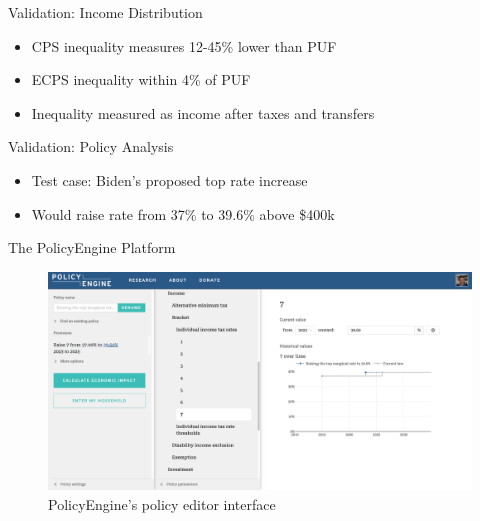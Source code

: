 \documentclass{beamer}
\begin{document}
\begin{frame}{Validation: Income Distribution}
    \begin{table}
        \centering
        
    \end{table}
    \begin{itemize}
        \item CPS inequality measures 12-45\% lower than PUF
        \item ECPS inequality within 4\% of PUF
        \item Inequality measured as income after taxes and transfers
    \end{itemize}
\end{frame}

\begin{frame}{Validation: Policy Analysis}
    \begin{itemize}
        \item Test case: Biden's proposed top rate increase
        \item Would raise rate from 37\% to 39.6\% above \$400k
    \end{itemize}
    \begin{table}
        \centering
        
    \end{table}
\end{frame}

\begin{frame}{The PolicyEngine Platform}
    \begin{figure}
        \centering
        \includegraphics[width=\textwidth]{../../paper/figures/policyengine_policy.png}
        \caption{PolicyEngine's policy editor interface}
    \end{figure}
\end{frame}
\end{document}
